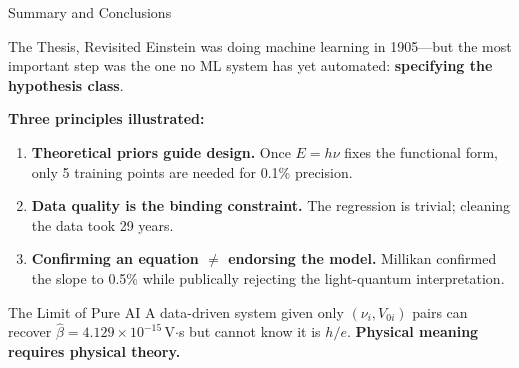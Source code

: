 \documentclass[aspectratio=169,12pt]{beamer}
\begin{document}
\begin{frame}[shrink=5]{Summary and Conclusions}

\begin{block}{The Thesis, Revisited}
Einstein was doing machine learning in 1905---but the most important step
was the one no ML system has yet automated: \textbf{specifying the
hypothesis class}.
\end{block}

\bigskip
\textbf{Three principles illustrated:}
\begin{enumerate}
  \item \textbf{Theoretical priors guide design.} Once $E=h\nu$ fixes the
    functional form, only 5 training points are needed for 0.1\% precision.
  \item \textbf{Data quality is the binding constraint.} The regression is
    trivial; cleaning the data took 29 years.
  \item \textbf{Confirming an equation $\neq$ endorsing the model.}
    Millikan confirmed the slope to 0.5\% while publically rejecting the
    light-quantum interpretation.
\end{enumerate}

\bigskip
\begin{alertblock}{The Limit of Pure AI}
A data-driven system given only $(\nu_i, V_{0i})$ pairs can recover
$\hat\beta = 4.129\times10^{-15}$\,V$\cdot$s but cannot know it is $h/e$.
\textbf{Physical meaning requires physical theory.}
\end{alertblock}

\end{frame}
\end{document}

